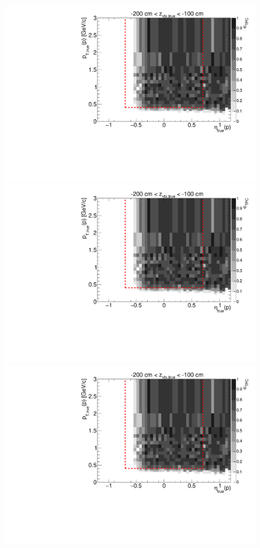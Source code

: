 \begin{figure}[hb]\ContinuedFloat
\centering
\parbox{0.495\textwidth}{
  \centering
  \includegraphics[width=\linewidth,page=11]{graphics/eff/Eff2D_TPC_proton_Plus.pdf}\\
  \includegraphics[width=\linewidth,page=13]{graphics/eff/Eff2D_TPC_proton_Plus.pdf}\\
  \includegraphics[width=\linewidth,page=15]{graphics/eff/Eff2D_TPC_proton_Plus.pdf}\\
}
\end{figure}

